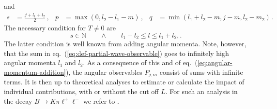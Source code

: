 \documentclass[aps,prd,reprint,nofootinbib,preprintnumbers]{revtex4}
\newcommand{\refeq}[1]{eq.~(\ref{eq:#1})}
\begin{document}
and
\begin{equation}
\begin{aligned}
    s & = \frac{j + l_1 + l_2}{2}\,, &
    p & = \max(0, l_2 - l_1 - m)\,, &
    q & = \min(l_1 + l_2 - m, j - m, l_2 - m_2)\,.
\end{aligned}
\end{equation}
The necessary condition for $T \neq 0$ are
\begin{equation}
    \label{eq:angular-momentum-addition}
    s \in \mathbb{N}\qquad \wedge \qquad l_1 - l_2 \leq l \leq l_1 + l_2,.
\end{equation}
The latter condition is well known from adding angular momenta. Note, however, that
the sum in \refeq{def-partial-wave-observable} goes to infinitely high angular momenta $l_1$ and $l_2$. As a consequence
of this and of \refeq{angular-momentum-addition}, the angular observables $P_{j,m}$
consist of sums with infinite terms. It is then up to theoretical analyses to
estimate or calculate the impact of individual contributions, with or without the cut off $L$.
For such an analysis in the decay $B\to K\pi\ell^+\ell^-$ we refer to \cite{Das:2014}.



\end{document}

